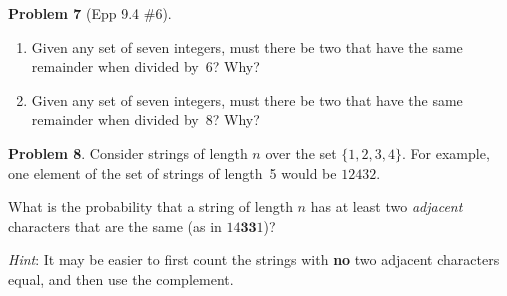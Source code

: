 \documentclass[11pt]{article}
\begin{document}
\bigskip

\noindent\textbf{Problem 7} (Epp 9.4 \#6).
\begin{enumerate}[label=\alph*.]
  \item Given any set of seven integers, must there be two that have the same
        remainder when divided by~6?  Why?
  \item Given any set of seven integers, must there be two that have the same
        remainder when divided by~8?  Why?
\end{enumerate}

\bigskip

\noindent\textbf{Problem 8}. \;
Consider strings of length $n$ over the set $\{1, 2, 3, 4\}$.  For example,
one element of the set of strings of length~5 would be $12432$.

\medskip
What is the probability that a string of length $n$ has at least two
\emph{adjacent} characters that are the same (as in $14\mathbf{33}1$)?

\medskip\noindent
\emph{Hint}: It may be easier to first count the strings with \textbf{no} two
adjacent characters equal, and then use the complement.
\end{document}
